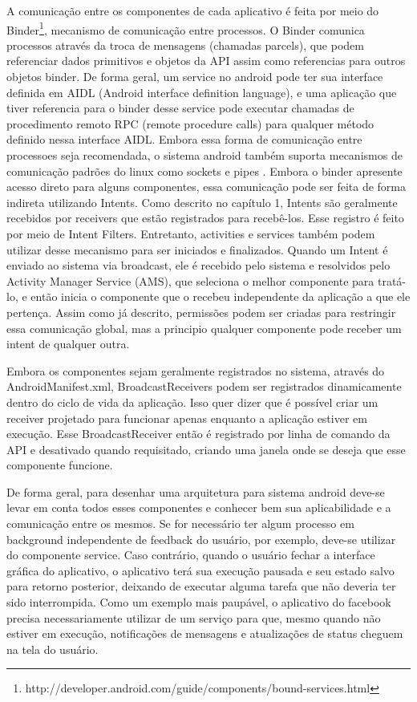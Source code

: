 A comunicação entre os componentes de cada aplicativo é feita por meio do Binder\footnote{http://developer.android.com/guide/components/bound-services.html}, mecanismo de comunicação entre processos. O Binder comunica processos através da troca de mensagens (chamadas parcels), que podem referenciar dados primitivos e objetos da API assim como referencias para outros objetos binder. De forma geral, um service no android pode ter sua interface definida em AIDL (Android interface definition language), e uma aplicação que tiver referencia para o binder desse service pode executar chamadas de procedimento remoto RPC (remote procedure calls) para qualquer método definido nessa interface AIDL. Embora essa forma de comunicação entre processoes seja recomendada, o sistema android também suporta mecanismos de comunicação padrões do linux como sockets e pipes \cite{heuser2014}. Embora o binder apresente acesso direto para alguns componentes, essa comunicação pode ser feita de forma indireta utilizando Intents. Como descrito no capítulo 1, Intents são geralmente recebidos por receivers que estão registrados para recebê-los. Esse registro é feito por meio de Intent Filters. Entretanto, activities e services também podem utilizar desse mecanismo para ser iniciados e finalizados. Quando um Intent é enviado ao sistema via broadcast, ele é recebido pelo sistema e resolvidos pelo Activity Manager Service (AMS), que seleciona o melhor componente para tratá-lo, e então inicia o componente que o recebeu independente da aplicação a que ele pertença. Assim como já descrito, permissões podem ser criadas para restringir essa comunicação global, mas a principio qualquer componente pode receber um intent de qualquer outra. 

Embora os componentes sejam geralmente registrados no sistema, através do AndroidManifest.xml, BroadcastReceivers podem ser registrados dinamicamente dentro do ciclo de vida da aplicação. Isso quer dizer que é possível criar um receiver projetado para funcionar apenas enquanto a aplicação estiver em execução. Esse BroadcastReceiver então é registrado por linha de comando da API e desativado quando requisitado, criando uma janela onde se deseja que esse componente funcione.

De forma geral, para desenhar uma arquitetura para sistema android deve-se levar em conta todos esses componentes e conhecer bem sua aplicabilidade e a comunicação entre os mesmos. Se for necessário ter algum processo em background independente de feedback do usuário, por exemplo, deve-se utilizar do componente service. Caso contrário, quando o usuário fechar a interface gráfica do aplicativo, o aplicativo terá sua execução pausada e seu estado salvo para retorno posterior, deixando de executar alguma tarefa que não deveria ter sido interrompida. Como um exemplo mais paupável, o aplicativo do facebook precisa necessariamente utilizar de um serviço para que, mesmo quando não estiver em execução, notificações de mensagens e atualizações de status cheguem na tela do usuário.

